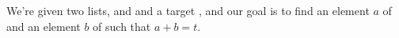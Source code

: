 \begin{prob}
    We're given two lists,  and  and a target , and our goal is to find an element $a$ of  and an element $b$ of  such that $a + b = t$.
    
    \begin{soln}
        \inputminted{python}{\thisdir/include-solution/target_sum.py}

    \end{soln}
\end{prob}
